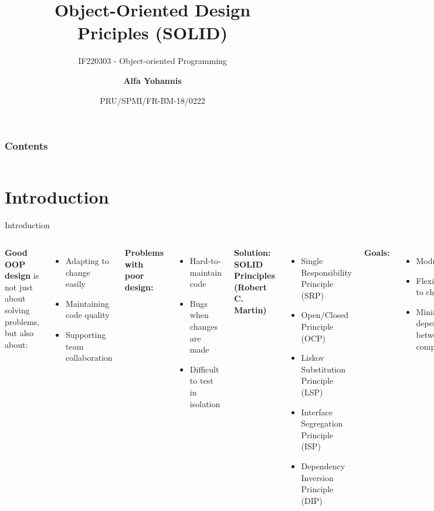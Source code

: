\documentclass[aspectratio=169, table]{beamer}
\subtitle{IF220303 - Object-oriented Programming}
\title{\Huge{Object-Oriented Design\\\vspace{5pt}Priciples (SOLID)}}
\date[Serial]{\scriptsize {PRU/SPMI/FR-BM-18/0222}}
\author[Pradita]{\small {\textbf{Alfa Yohannis}}}
\begin{document}
\frame{\titlepage}

\begin{frame}[fragile]
\frametitle{Contents}
\vspace{20pt}
\begin{columns}[t]
	\tableofcontents[sections={1-5}]
	
	\tableofcontents[sections={6-10}]
\end{columns}
\end{frame}

\section{Introduction}

\begin{frame}[fragile]{Introduction}
	\vspace{20pt}
	\begin{columns}[t]
		\textbf{Good OOP design} is not just about solving problems,
		but also about:
		\begin{itemize}
			\item Adapting to change easily
			\item Maintaining code quality
			\item Supporting team collaboration
		\end{itemize}
		
		\textbf{Problems with poor design:}
		\begin{itemize}
			\item Hard-to-maintain code
			\item Bugs when changes are made
			\item Difficult to test in isolation
		\end{itemize}
		
		\textbf{Solution: SOLID Principles (Robert C. Martin)}
		\begin{itemize}
			\item Single Responsibility Principle (SRP)
			\item Open/Closed Principle (OCP)
			\item Liskov Substitution Principle (LSP)
			\item Interface Segregation Principle (ISP)
			\item Dependency Inversion Principle (DIP)
		\end{itemize}
		
		\textbf{Goals:}
		\begin{itemize}
			\item Modularity
			\item Flexibility to changes
			\item Minimal dependency between components
		\end{itemize}
	\end{columns}
\end{frame}
\end{document}
